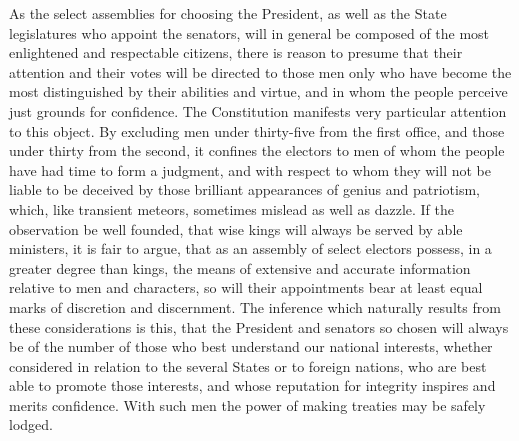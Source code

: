 As the select assemblies for choosing the President, as well as the State legislatures who appoint the senators, will in general be composed of the most enlightened and respectable citizens, there is reason to presume that their attention and their votes will be directed to those men only who have become the most distinguished by their abilities and virtue, and in whom the people perceive just grounds for confidence. The Constitution manifests very particular attention to this object. By excluding men under thirty-five from the first office, and those under thirty from the second, it confines the electors to men of whom the people have had time to form a judgment, and with respect to whom they will not be liable to be deceived by those brilliant appearances of genius and patriotism, which, like transient meteors, sometimes mislead as well as dazzle. If the observation be well founded, that wise kings will always be served by able ministers, it is fair to argue, that as an assembly of select electors possess, in a greater degree than kings, the means of extensive and accurate information relative to men and characters, so will their appointments bear at least equal marks of discretion and discernment. The inference which naturally results from these considerations is this, that the President and senators so chosen will always be of the number of those who best understand our national interests, whether considered in relation to the several States or to foreign nations, who are best able to promote those interests, and whose reputation for integrity inspires and merits confidence. With such men the power of making treaties may be safely lodged.


